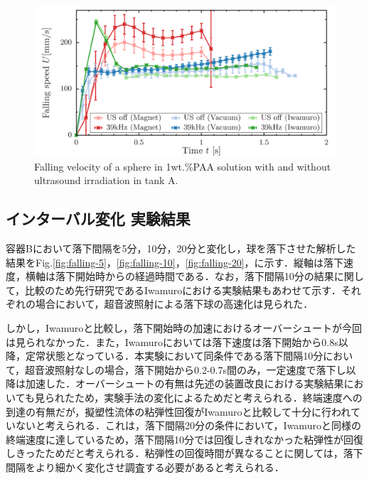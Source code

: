 \begin{figure}[ht]
    \centering
    \includegraphics[width=12cm,clip]{./4-Results/s1-A.png}
    \caption{Falling velocity of a sphere in 1wt.\%PAA solution with and without ultrasound irradiation in tank A.}
    \label{fig:falling-A}
\end{figure}

\newpage

\subsection{インターバル変化 実験結果}

容器Bにおいて落下間隔を5分，10分，20分と変化し，球を落下させた解析した結果をFig.\ref{fig:falling-5}，\ref{fig:falling-10}，\ref{fig:falling-20}，に示す．縦軸は落下速度，横軸は落下開始時からの経過時間である．なお，落下間隔10分の結果に関して，比較のため先行研究であるIwamuro\cite{ref:9}における実験結果もあわせて示す．それぞれの場合において，超音波照射による落下球の高速化は見られた．

しかし，Iwamuro\cite{ref:9}と比較し，落下開始時の加速におけるオーバーシュートが今回は見られなかった．また，Iwamuro\cite{ref:9}においては落下速度は落下開始から0.8s以降，定常状態となっている．本実験において同条件である落下間隔10分において，超音波照射なしの場合，落下開始から0.2-0.7s間のみ，一定速度で落下し以降は加速した．オーバーシュートの有無は先述の装置改良における実験結果においても見られたため，実験手法の変化によるためだと考えられる．終端速度への到達の有無だが，擬塑性流体の粘弾性回復がIwamuro\cite{ref:9}と比較して十分に行われていないと考えられる．これは，落下間隔20分の条件において，Iwamuro\cite{ref:9}と同様の終端速度に達しているため，落下間隔10分では回復しきれなかった粘弾性が回復しきったためだと考えられる．粘弾性の回復時間が異なることに関しては，落下間隔をより細かく変化させ調査する必要があると考えられる．

